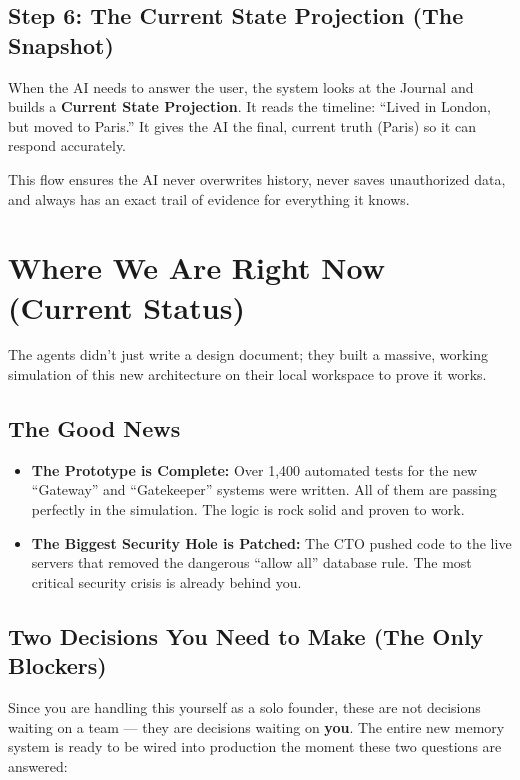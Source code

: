 \documentclass[12pt]{article}
\begin{document}
\subsection*{Step 6: The Current State Projection (The Snapshot)}
When the AI needs to answer the user, the system looks at the Journal and builds a \textbf{Current State Projection}. It reads the timeline: ``Lived in London, but moved to Paris.'' It gives the AI the final, current truth (Paris) so it can respond accurately.

This flow ensures the AI never overwrites history, never saves unauthorized data, and always has an exact trail of evidence for everything it knows.

\section{Where We Are Right Now (Current Status)}

The agents didn't just write a design document; they built a massive, working simulation of this new architecture on their local workspace to prove it works.

\subsection{The Good News}
\begin{itemize}
    \item \textbf{The Prototype is Complete:} Over 1,400 automated tests for the new ``Gateway'' and ``Gatekeeper'' systems were written. All of them are passing perfectly in the simulation. The logic is rock solid and proven to work.
    \item \textbf{The Biggest Security Hole is Patched:} The CTO pushed code to the live servers that removed the dangerous ``allow all'' database rule. The most critical security crisis is already behind you.
\end{itemize}

\subsection{Two Decisions You Need to Make (The Only Blockers)}

Since you are handling this yourself as a solo founder, these are not decisions waiting on a team --- they are decisions waiting on \textbf{you}. The entire new memory system is ready to be wired into production the moment these two questions are answered:
\end{document}
